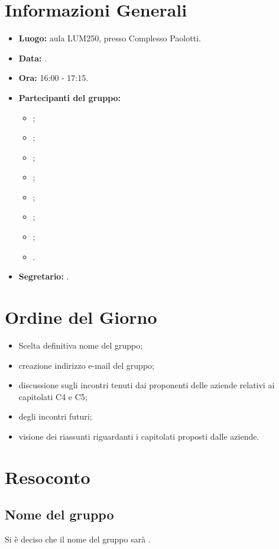 \section{Informazioni Generali}
\begin{itemize}
\item \textbf{Luogo:} aula LUM250, presso Complesso Paolotti.
\item \textbf{Data:} \Data.
\item \textbf{Ora:} 16:00 - 17:15.
\item \textbf{Partecipanti del gruppo:}
	\begin{itemize}
		\item \AT{}; 
		\item \BR{};
		\item \CE{}; 
		\item \DF{};
		\item \LD{};
		\item \MC{};
		\item \PF{};
		\item \SE{}.
	\end{itemize} 
\item \textbf{Segretario:} \BR{}.
\end{itemize}


\section{Ordine del Giorno}
\begin{itemize}
	\item Scelta definitiva nome del gruppo;
	\item creazione indirizzo e-mail del gruppo;
	\item discussione sugli incontri tenuti dai proponenti delle aziende relativi ai capitolati C4 e C5;
	\item {} degli incontri futuri;
	\item visione dei riassunti riguardanti i capitolati proposti dalle aziende.
\end{itemize}


\section{Resoconto}
\subsection{Nome del gruppo}
Si è deciso che il nome del gruppo sarà \Gruppo{}.


